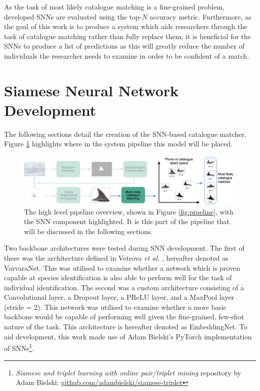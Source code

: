 As the task of most likely catalogue matching is a fine-grained problem, developed SNNs are evaluated using the top-$N$ accuracy metric. Furthermore, as the goal of this work is to produce a system which aids researchers through the task of catalogue matching rather than fully replace them, it is beneficial for the SNNs to produce a list of predictions as this will greatly reduce the number of individuals the researcher needs to examine in order to be confident of a match.

\section{Siamese Neural Network Development}\label{ch:ID,sec:SNNDevelopment}

The following sections detail the creation of the SNN-based catalogue matcher. Figure \ref{fig:pipeline-SNN} highlights where in the system pipeline this model will be placed.

\begin{figure}[!h]
	\begin{center}
		\includegraphics[width=\linewidth]{Chapter6/figs/pipeline-SNN.png}
	\end{center}
	\caption[The high level pipeline overview, shown in Figure \ref{fig:pipeline}, with the SNN component highlighted.]{The high level pipeline overview, shown in Figure \ref{fig:pipeline}, with the SNN component highlighted. It is this part of the pipeline that will be discussed in the following sections.}
	\label{fig:pipeline-SNN}
\end{figure}

Two backbone architectures were tested during SNN development. The first of these was the architecture defined in Vetrova \textit{et al.} \cite{vetrova_hidden_2018}, hereafter denoted as VarvaraNet. This was utilised to examine whether a network which is proven capable at species identification is also able to perform well for the task of individual identification. The second was a custom architecture consisting of a Convolutional layer, a Dropout layer, a PReLU layer, and a MaxPool layer (stride = 2). This network was utilised to examine whether a more basic backbone would be capable of performing well given the fine-grained, few-shot nature of the task. This architecture is hereafter denoted as EmbeddingNet. To aid development, this work made use of Adam Bielski's PyTorch implementation of SNNs\footnote{\textit{Siamese and triplet learning with online pair/triplet mining} repository by Adam Bielski: \href{https://github.com/adambielski/siamese-triplet}{github.com/adambielski/siamese-triplet}}.

